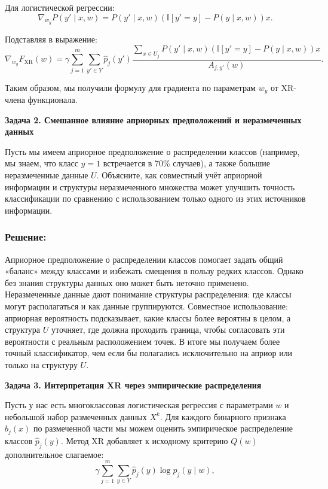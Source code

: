 Для логистической регрессии:
\[
\nabla_{w_y}P(y' \mid x,w) = P(y' \mid x,w)(\mathbb{I}[y'=y]-P(y \mid x,w))x.
\]

Подставляя в выражение:
\[
\nabla_{w_y} F_{\text{XR}}(w) = \gamma \sum_{j=1}^m \sum_{y' \in Y} \hat{p}_j(y') \frac{\sum_{x \in U_j} P(y' \mid x,w)(\mathbb{I}[y'=y]-P(y \mid x,w))x}{A_{j,y'}(w)}.
\]

Таким образом, мы получили формулу для градиента по параметрам $w_y$ от XR-члена функционала.

\bigskip

\noindent\textbf{Задача 2. Смешанное влияние априорных предположений и неразмеченных данных}

Пусть мы имеем априорное предположение о распределении классов (например, мы знаем, что класс $y=1$ встречается в 70\% случаев), а также большие неразмеченные данные $U$. Объясните, как совместный учёт априорной информации и структуры неразмеченного множества может улучшить точность классификации по сравнению с использованием только одного из этих источников информации.

\subsubsection*{Решение:}
Априорное предположение о распределении классов помогает задать общий «баланс» между классами и избежать смещения в пользу редких классов. Однако без знания структуры данных оно может быть неточно применено. Неразмеченные данные дают понимание структуры распределения: где классы могут располагаться и как данные группируются. Совместное использование: априорная вероятность подсказывает, какие классы более вероятны в целом, а структура $U$ уточняет, где должна проходить граница, чтобы согласовать эти вероятности с реальным расположением точек. В итоге мы получаем более точный классификатор, чем если бы полагались исключительно на априор или только на структуру $U$.

\bigskip

\noindent\textbf{Задача 3. Интерпретация XR через эмпирические распределения}

Пусть у нас есть многоклассовая логистическая регрессия с параметрами $w$ и небольшой набор размеченных данных $X^k$. Для каждого бинарного признака $b_j(x)$ по размеченной части мы можем оценить эмпирическое распределение классов $\hat{p}_j(y)$. Метод XR добавляет к исходному критерию $Q(w)$ дополнительное слагаемое:
\[
\gamma \sum_{j=1}^m \sum_{y \in Y} \hat{p}_j(y) \log p_j(y \mid w),
\]

